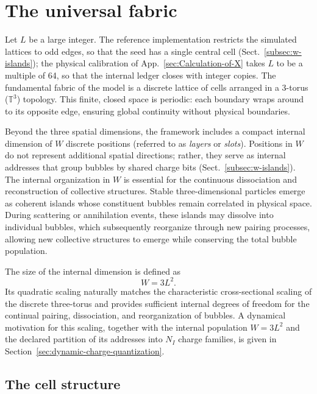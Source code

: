 \documentclass[a4paper]{article}
\begin{document}
\section{The universal fabric}
\label{sec:space-and-time}

Let $L$ be a large integer.  The reference implementation restricts the simulated lattices to odd edges, so that the seed has a single central cell (Sect.~\ref{subsec:w-islands}); the physical calibration of App.~\ref{sec:Calculation-of-X} takes $L$ to be a multiple of 64, so that the internal ledger closes with integer copies. The fundamental fabric of the model is a discrete lattice of cells arranged in a 3-torus ($\mathbb{T}^3$) topology. This finite, closed space is periodic: each boundary wraps around to its opposite edge, ensuring global continuity without physical boundaries.

Beyond the three spatial dimensions, the framework includes a compact internal dimension of $W$ discrete positions (referred to as \emph{layers} or \emph{slots}). Positions in $W$ do not represent additional spatial directions; rather, they serve as internal addresses that group bubbles by shared charge bits (Sect.~\ref{subsec:w-islands}). The internal organization in $W$ is essential for the continuous dissociation and reconstruction of collective structures. Stable three-dimensional particles emerge as coherent islands whose constituent bubbles remain correlated in physical space. During scattering or annihilation events, these islands may dissolve into individual bubbles, which subsequently reorganize through new pairing processes, allowing new collective structures to emerge while conserving the total bubble population.

The size of the internal dimension is defined as
\begin{equation}
W = 3L^2.
\end{equation}
Its quadratic scaling naturally matches the characteristic cross-sectional scaling of the discrete three-torus and provides sufficient internal degrees of freedom for the continual pairing, dissociation, and reorganization of bubbles. A dynamical motivation for this scaling, together with the internal population $W=3L^2$ and the declared partition of its addresses into $N_I$ charge families, is given in Section~\ref{sec:dynamic-charge-quantization}.

\subsection{The cell structure}
\label{subsec:The-cell-structure}
\end{document}
